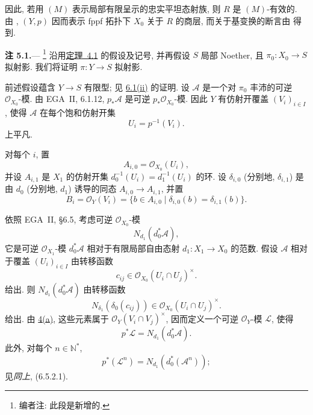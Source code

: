 
因此, 若用 \((M)\) 表示局部有限呈示的忠实平坦态射族,
则 \(R\) 是 \((M)\)-有效的.
由 ,
\((Y,p)\) 因而表示 fppf 拓扑下 \(X_0\) 关于 \(R\) 的商层,
而关于基变换的断言由  得到.

\medskip
{}\label{rem:sga3-V-5.1}%
\noindent\textbf{注 5.1.}---%
\footnote{\label{note:sga3-V-30}编者注: 此段是新增的.}
沿用\hyperref[thm:sga3-V-4.1]{定理~4.1} 的假设及记号,
并再假设 \(S\) 局部 Noether, 且 \(\pi_0:X_0\to S\) 拟射影.
我们将证明 \(\pi:Y\to S\) 拟射影.

前述假设蕴含 \(Y\to S\) 有限型;
见 \hyperref[lem:sga3-V-6.1-ii]{6.1(ii)} 的证明.
设 \(\mathscr A\) 是一个对 \(\pi_0\) 丰沛的可逆
\(\mathcal O_{X_0}\)-模. 由 EGA~II, 6.1.12,
\(p_\ast\mathscr A\) 是可逆 \(p_\ast\mathcal O_{X_0}\)-模.
因此 \(Y\) 有仿射开覆盖 \((V_i)_{i\in I}\),
使得 \(\mathscr A\) 在每个饱和仿射开集
\[
  U_i=p^{-1}(V_i).
\]
上平凡.

对每个 \(i\), 置
\[
  A_{i,0}=\mathcal O_{X_0}(U_i),
\]
并设 \(A_{i,1}\) 是 \(X_1\) 的仿射开集
\(d_0^{-1}(U_i)=d_1^{-1}(U_i)\) 的环.
设 \(\delta_{i,0}\) (分别地, \(\delta_{i,1}\))
是由 \(d_0\) (分别地, \(d_1\)) 诱导的同态
\(A_{i,0}\to A_{i,1}\), 并置
\[
  B_i=\mathcal O_Y(V_i)
  =\{b\in A_{i,0}\mid\delta_{i,0}(b)=\delta_{i,1}(b)\}.
\]

依照 EGA~II, \S6.5, 考虑可逆 \(\mathcal O_{X_0}\)-模
\[
  N_{d_1}\!\left(d_0^\ast\mathscr A\right),
\]
它是可逆 \(\mathcal O_{X_1}\)-模 \(d_0^\ast\mathscr A\)
相对于有限局部自由态射 \(d_1:X_1\to X_0\) 的范数.
假设 \(\mathscr A\) 相对于覆盖 \((U_i)_{i\in I}\)
由转移函数
\[
  c_{ij}\in\mathcal O_{X_0}(U_i\cap U_j)^\times.
\]
给出. 则 \(N_{d_1}(d_0^\ast\mathscr A)\) 由转移函数
\[
  N_{\delta_1}(\delta_0(c_{ij}))
  \in\mathcal O_{X_0}(U_i\cap U_j)^\times.
\]
给出. 由 \hyperref[proof:sga3-V-4.1-a]{4(a)},
这些元素属于 \(\mathcal O_Y(V_i\cap V_j)^\times\),
因而定义一个可逆 \(\mathcal O_Y\)-模 \(\mathscr L\), 使得
\[
  p^\ast\mathscr L=N_{d_1}(d_0^\ast\mathscr A).
\]
此外, 对每个 \(n\in\mathbb N^\ast\),
\[
  p^\ast(\mathscr L^n)
  =N_{d_1}\!\left(d_0^\ast(\mathscr A^n)\right);
\]
见\emph{同上}, (6.5.2.1).

